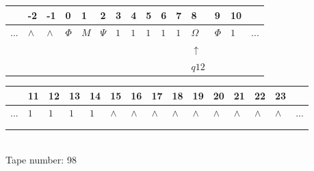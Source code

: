 \documentclass[11pt]{article}
\begin{document}
\begin{table}[H]
\centering
\begin{tabular}{lllllllllllllll}
 & -2 & -1 & 0 & 1 & 2 & 3 & 4 & 5 & 6 & 7 & 8 & 9 & 10 & \\
\hline
$...$ & \multicolumn{1}{|l|}{$\wedge$} & \multicolumn{1}{|l|}{$\wedge$} & \multicolumn{1}{|l|}{$\Phi$} & \multicolumn{1}{|l|}{$M$} & \multicolumn{1}{|l|}{$\Psi$} & \multicolumn{1}{|l|}{$1$} & \multicolumn{1}{|l|}{$1$} & \multicolumn{1}{|l|}{$1$} & \multicolumn{1}{|l|}{$1$} & \multicolumn{1}{|l|}{$1$} & \multicolumn{1}{|l|}{$\Omega$} & \multicolumn{1}{|l|}{$\Phi$} & \multicolumn{1}{|l|}{$1$} & $...$\\
\hline
&  &  &  &  &  &  &  &  &  &  & $\uparrow$ &  &  &  \\
&  &  &  &  &  &  &  &  &  &  & $ q12 $ &  &  &  \\
\end{tabular}
\begin{tabular}{lllllllllllllll}
 & 11 & 12 & 13 & 14 & 15 & 16 & 17 & 18 & 19 & 20 & 21 & 22 & 23 & \\
\hline
$...$ & \multicolumn{1}{|l|}{$1$} & \multicolumn{1}{|l|}{$1$} & \multicolumn{1}{|l|}{$1$} & \multicolumn{1}{|l|}{$1$} & \multicolumn{1}{|l|}{$\wedge$} & \multicolumn{1}{|l|}{$\wedge$} & \multicolumn{1}{|l|}{$\wedge$} & \multicolumn{1}{|l|}{$\wedge$} & \multicolumn{1}{|l|}{$\wedge$} & \multicolumn{1}{|l|}{$\wedge$} & \multicolumn{1}{|l|}{$\wedge$} & \multicolumn{1}{|l|}{$\wedge$} & \multicolumn{1}{|l|}{$\wedge$} & $...$\\
\hline
&  &  &  &  &  &  &  &  &  &  &  &  &  &  \\
&  &  &  &  &  &  &  &  &  &  &  &  &  &  \\
\end{tabular}
\\
Tape number: 98
\noindent\makebox[\linewidth]{\hdashrule{\textwidth}{1pt}{1pt}}\end{table}
\end{document}
